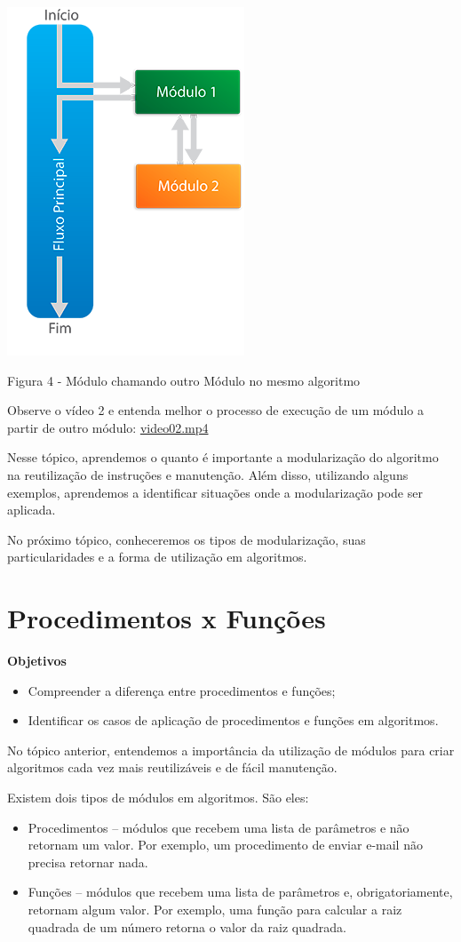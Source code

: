 \documentclass[11pt]{article}
\begin{document}
\begin{center}

\includegraphics[width=.3\linewidth]{figura04.png}

\caption{Figura 4 - Módulo chamando outro Módulo no mesmo algoritmo}

\end{center}


Observe o vídeo 2 e entenda melhor o processo de execução de um módulo a partir de outro módulo:
\url{video02.mp4}

Nesse tópico, aprendemos o quanto é importante a modularização do algoritmo na reutilização de instruções e manutenção. Além disso, utilizando alguns exemplos, aprendemos a identificar situações onde a modularização pode ser aplicada.

No próximo tópico, conheceremos os tipos de modularização, suas particularidades e a forma de utilização em algoritmos.

\section{Procedimentos x Funções}
\label{sec:org20662f5}
\textbf{Objetivos}
\begin{itemize}
\item Compreender a diferença entre procedimentos e funções;
\item Identificar os casos de aplicação de procedimentos e funções em algoritmos.
\end{itemize}

No tópico anterior, entendemos a importância da utilização de módulos para criar algoritmos cada vez mais reutilizáveis e de fácil manutenção.

Existem dois tipos de módulos em algoritmos. São eles:

\begin{itemize}
\item Procedimentos – módulos que recebem uma lista de parâmetros e não retornam um valor. Por exemplo, um procedimento de enviar e-mail não precisa retornar nada.
\item Funções – módulos que recebem uma lista de parâmetros e, obrigatoriamente, retornam algum valor. Por exemplo, uma função para calcular a raiz quadrada de um número retorna o valor da raiz quadrada.
\end{itemize}
\end{document}

